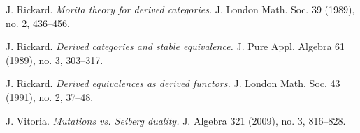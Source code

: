 \documentclass{amsart}
\begin{document}
\begin{thebibliography}{99}
 J. Rickard.  \emph{Morita theory for derived categories.}  J. London Math. Soc. 39 (1989), no. 2, 436--456.

 J. Rickard.  \emph{Derived categories and stable equivalence.}  J. Pure Appl. Algebra 61 (1989), no. 3, 303--317.

 J. Rickard.  \emph{Derived equivalences as derived functors.}  J. London Math. Soc. 43 (1991), no. 2, 37--48.



 J. Vitoria.  \emph{Mutations vs. Seiberg duality.}  J. Algebra 321  (2009),  no. 3, 816--828. 

\end{thebibliography}
\end{document}

